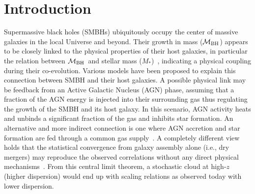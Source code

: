 \documentclass[twocolumn,trackchanges]{aastex63}
\newcommand{\mbh}{$\mathcal M_{\rm BH}$}
\newcommand{\mstar}{{$M_*$}}
\newcommand{\blue}[1]{{{#1}}}
\begin{document}

\section{Introduction} \label{sec:intro}
\blue{Supermassive black holes (SMBHs) ubiquitously occupy the center of massive galaxies in the local Universe and beyond. Their growth in mass (\mbh) appears to be closely linked to the physical properties of their host galaxies, in particular the relation between \mbh ~and stellar mass (\mstar)~\citep{Mag++98, F+M00, M+H03, H+R04, Gul++09}, indicating a physical coupling during their co-evolution.}
Various models have been proposed to explain this connection between SMBH and their host galaxies. A possible physical link may be feedback from an Active Galactic Nucleus (AGN) phase, assuming that a fraction of the AGN energy is injected into their surrounding gas thus regulating the growth of the SMBH and its host galaxy. In this scenario, AGN activity heats and unbinds a significant fraction of the gas and inhibits star formation. An alternative and more indirect connection is one where AGN accretion and star formation are fed through a common gas supply~\citep{Cen2015, Menci2016}. A completely different view holds that the statistical convergence from galaxy assembly alone (i.e., dry mergers) may reproduce the observed correlations without any direct physical mechanisms~\citep{Peng2007, Jahnke2011, Hirschmann2010}. From this central limit theorem, a stochastic cloud at high-$z$ (higher dispersion) would end up with scaling relations as observed today with lower dispersion.
\end{document}
